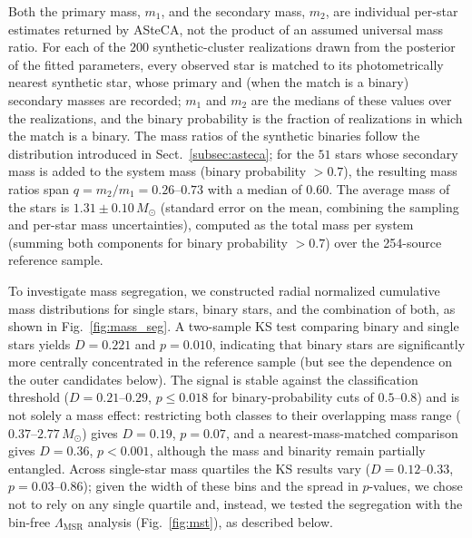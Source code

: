\documentclass{aa}
\begin{document}
Both the primary mass, $m_1$, and the secondary mass, $m_2$, are individual per-star estimates returned by ASteCA, not the product of an assumed universal mass ratio. For each of the $200$ synthetic-cluster realizations drawn from the posterior of the fitted parameters, every observed star is matched to its photometrically nearest synthetic star, whose primary and (when the match is a binary) secondary masses are recorded; $m_1$ and $m_2$ are the medians of these values over the realizations, and the binary probability is the fraction of realizations in which the match is a binary. The mass ratios of the synthetic binaries follow the \citet{2013ARA&A..51..269D} distribution introduced in Sect.~\ref{subsec:asteca}; for the $51$ stars whose secondary mass is added to the system mass (binary probability $>0.7$), the resulting mass ratios span $q=m_2/m_1=0.26$--$0.73$ with a median of $0.60$. The average mass of the stars is $1.31 \pm 0.10\,M_\odot$ (standard error on the mean, combining the sampling and per-star mass uncertainties), computed as the total mass per system (summing both components for binary probability $>0.7$) over the 254-source reference sample.

To investigate mass segregation, we constructed radial normalized cumulative mass distributions for single stars, binary stars, and the combination of both, as shown in Fig.~\ref{fig:mass_seg}. A two-sample KS test comparing binary and single stars yields $D=0.221$ and $p=0.010$, indicating that binary stars are significantly more centrally concentrated in the reference sample (but see the dependence on the outer candidates below). The signal is stable against the classification threshold ($D=0.21$--$0.29$, $p\leq0.018$ for binary-probability cuts of $0.5$--$0.8$) and is not solely a mass effect: restricting both classes to their overlapping mass range ($0.37$--$2.77\,M_\odot$) gives $D=0.19$, $p=0.07$, and a nearest-mass-matched comparison gives $D=0.36$, $p<0.001$, although the mass and binarity remain partially entangled. Across single-star mass quartiles the KS results vary ($D=0.12$--$0.33$, $p=0.03$--$0.86$); given the width of these bins and the spread in $p$-values, we chose not to rely on any single quartile and, instead, we tested the segregation with the bin-free $\Lambda_{\mathrm{MSR}}$ analysis (Fig.~\ref{fig:mst}), as described below.
\end{document}
